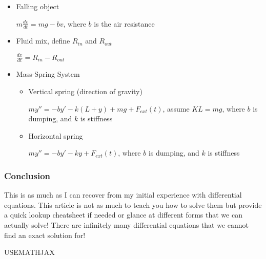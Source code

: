 \documentclass[12pt]{article}
\begin{document}
\begin{itemize}
\item Falling object
\label{sec:org924a5a0}

\(m\frac{dv}{dt}=mg-bv\), where \(b\) is the air resistance

\item Fluid mix, define \(R_{in}\) and \(R_{out}\)
\label{sec:org8a1ddc1}

\(\frac{dx}{dt}=R_{in}-R_{out}\)

\item Mass-Spring System
\label{sec:orgfc7c1b1}

\begin{itemize}
\item Vertical spring (direction of gravity)
\label{sec:org985370a}

\(my''=-by'-k(L+y)+mg+F_{ext}(t)\), assume \(KL=mg\), where \(b\) is dumping, and \(k\) is stiffness

\item Horizontal spring
\label{sec:orga151110}

\(my''=-by'-ky+F_{ext}(t)\), where \(b\) is dumping, and \(k\) is stiffness
\end{itemize}
\end{itemize}

\subsubsection*{Conclusion}
\label{sec:org01a89df}
This is as much as I can recover from my initial experience with differential
equations. This article is not as much to teach you how to solve them but
provide a quick lookup cheatsheet if needed or glance at different forms that we
can actually solve! There are infinitely many differential equations that we
cannot find an exact solution for!

USEMATHJAX
\end{document}

